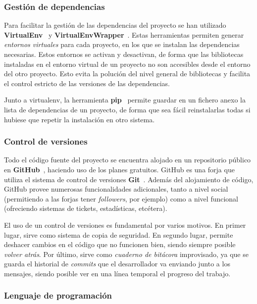 \subsubsection{Gestión de dependencias}
\label{subsec:gestion-dependencias}

Para facilitar la gestión de las dependencias del proyecto se han utilizado
\textbf{VirtualEnv}~\cite{virtualenv} y
\textbf{VirtualEnvWrapper}~\cite{virtualenvwrapper}. Estas herramientas permiten
generar \textit{entornos virtuales} para cada proyecto, en los que se instalan
las dependencias necesarias. Estos entornos se activan y desactivan, de forma
que las bibliotecas instaladas en el entorno virtual de un proyecto no son
accesibles desde el entorno del otro proyecto. Esto evita la polución del nivel
general de bibliotecas y facilita el control estricto de las versiones de las
dependencias. 

Junto a virtualenv, la herramienta \textbf{pip}~\cite{pip} permite guardar en un
fichero anexo la lista de dependencias de un proyecto, de forma que sea fácil
reinstalarlas todas si hubiese que repetir la instalación en otro sistema.

\subsubsection{Control de versiones}

Todo el código fuente del proyecto se encuentra alojado en un repositorio
público en \textbf{GitHub}~\cite{forja}, haciendo uso de los planes
gratuitos. GitHub es una forja que utiliza el sistema de control de versiones
\textbf{Git}~\cite{git}. Además del alojamiento de código, GitHub provee
numerosas funcionalidades adicionales, tanto a nivel social (permitiendo a las
forjas tener \textit{followers}, por ejemplo) como a nivel funcional (ofreciendo
sistemas de tickets, estadísticas, etcétera).

El uso de un control de versiones es fundamental por varios motivos. En primer
lugar, sirve como sistema de copia de seguridad. En segundo lugar, permite
deshacer cambios en el código que no funcionen bien, siendo siempre posible
\textit{volver atrás}. Por último, sirve como \textit{cuaderno de bitácora}
improvisado, ya que se guarda el historial de \textit{commits} que el
desarrollador va enviando junto a los mensajes, siendo posible ver en una línea
temporal el progreso del trabajo.

\subsubsection{Lenguaje de programación}

